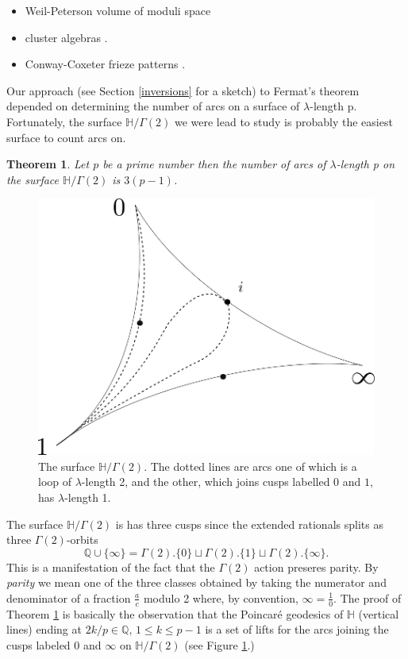 \documentclass[12pt,a4paper]{amsart}
\newtheorem{thm}{Theorem}[section]
\def\HH{\mathbb{H}}
\def\g2{\Gamma(2)}
\def\xx{\HH/\g2}
\def\qqq{\mathbb{Q} \cup \{\infty\}}
\begin{document}
\begin{itemize}
	\item Weil-Peterson volume of moduli space \cite{bob}
	\item cluster algebras \cite{fomin}.
	\item Conway-Coxeter frieze patterns \cite{frieze}.
\end{itemize}
Our approach (see Section \ref{inversions} for a sketch) to Fermat's theorem \cite{vlad} depended on determining the number of arcs on a surface
of $\lambda$-length p.
Fortunately, the surface $\xx$ we were lead to study is  probably
the easiest surface to count arcs on.

\begin{thm}\label{g2 arcs}
	Let $p$ be a prime number then the number of arcs of
	$\lambda$-length p on the surface
	$\xx$ is $3(p-1)$.
\end{thm}



 \begin{figure}[ht]
\begin{center}
\includegraphics[scale=.3]{3sphere.png} 
\end{center}
\caption{The surface $\xx$. The dotted lines are arcs one of which
is a loop of $\lambda$-length 2, 
and the other,
which joins cusps labelled $0$ and $1$, has $\lambda$-length 1.}
\label{3sphere}
\end{figure}

The surface  $\xx$ is has three cusps 
since the extended rationals  splits as three $\g2$-orbits
$$\qqq = \g2.\{0\} \sqcup  \g2. \{1\} \sqcup \g2. \{\infty\}.$$
This is a manifestation of the fact that the $\g2$ action 
preseres parity.
By \textit{parity} we mean one
of the three classes obtained by taking the 
numerator and denominator  of  a fraction $\frac{a}{c}$ modulo 2
where, by convention, $\infty = \frac{1}{0}$.
The proof of Theorem \ref{g2 arcs} is basically the observation that the Poincaré geodesics
of $\mathbb{H}$ (vertical lines) ending at $2k / p \in \mathbb{Q},\, 1\leq k \leq
p-1$ is a set of lifts for the arcs joining the cusps labeled $0$ and
$\infty$ on $\xx$ (see Figure \ref{3sphere}.)
\end{document}
